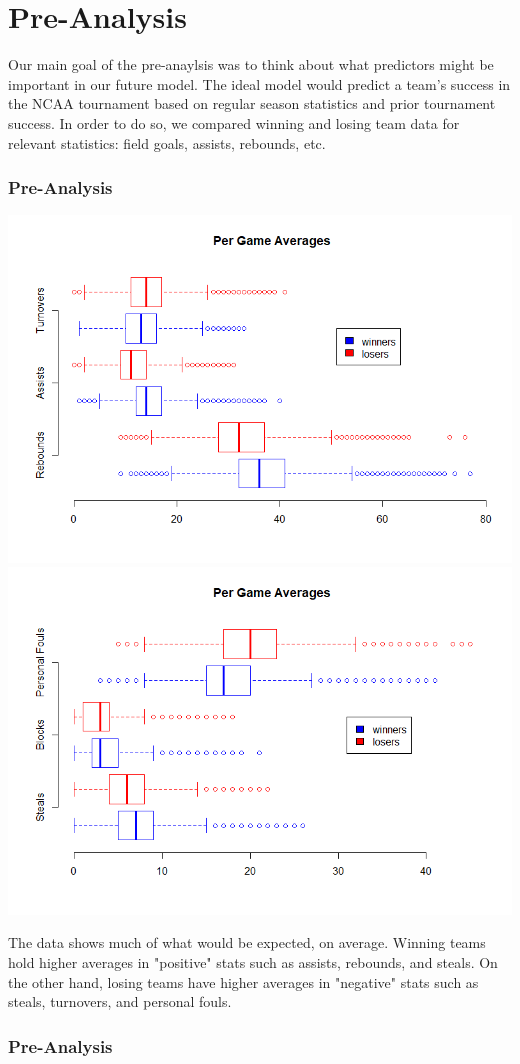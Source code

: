 \documentclass[11pt]{beamer}
\begin{document}
\section{Pre-Analysis}
\begin{frame}
\center Our main goal of the pre-anaylsis was to think about what predictors might be important in our future model. The ideal model would predict a team's success in the NCAA tournament based on regular season statistics and prior tournament success. In order to do so, we compared winning and losing team data for relevant statistics: field goals, assists, rebounds, etc. 
\frametitle{{\textbf{\huge Pre-Analysis}}}
\end{frame}
\begin{frame}
	\begin{center}
		\includegraphics[scale=0.255]{GameAverages.png}
		\includegraphics[scale=0.255]{GameAverages2.png}  
	\end{center}
\footnotesize \center The data shows much of what would be expected, on average. Winning teams hold higher averages in "positive" stats such as assists, rebounds, and steals. On the other hand, losing teams have higher averages in "negative" stats such as steals, turnovers, and personal fouls.
\frametitle{{\textbf{\huge Pre-Analysis}}}
\end{frame}
\end{document}
